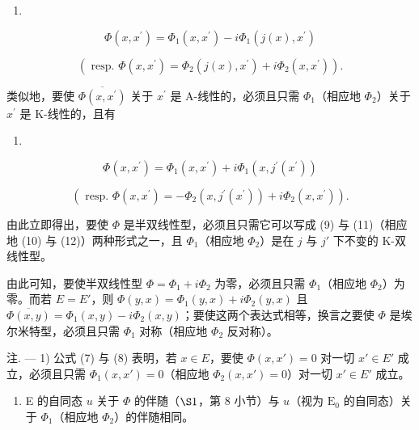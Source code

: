 \begin{enumerate}
\def\labelenumi{(\arabic{enumi})}
\setcounter{enumi}{8}
\tightlist
\item
\end{enumerate}

\[
\Phi (x, x ^ {\prime}) = \Phi_ {1} (x, x ^ {\prime}) - i \Phi_ {1} (j (x), x ^ {\prime})\tag{10}
\]

\[
(\text { resp. } \Phi (x, x ^ {\prime}) = \Phi_ {2} (j (x), x ^ {\prime}) + i \Phi_ {2} (x, x ^ {\prime})).
\]

类似地，要使 \(\overline{\Phi(x,x^{\prime})}\) 关于 \(x^{\prime}\) 是 A-线性的，必须且只需 \(\Phi_{1}\)（相应地 \(\Phi_{2}\)）关于 \(x^{\prime}\) 是 K-线性的，且有

\begin{enumerate}
\def\labelenumi{(\arabic{enumi})}
\setcounter{enumi}{10}
\tightlist
\item
\end{enumerate}

\[
\Phi (x, x ^ {\prime}) = \Phi_ {1} (x, x ^ {\prime}) + i \Phi_ {1} (x, j ^ {\prime} (x ^ {\prime}))\tag{12}
\]

\[
(\text { resp. } \Phi (x, x ^ {\prime}) = - \Phi_ {2} (x, j ^ {\prime} (x ^ {\prime})) + i \Phi_ {2} (x, x ^ {\prime})).
\]

由此立即得出，要使 \(\Phi\) 是半双线性型，必须且只需它可以写成 (9) 与 (11)（相应地 (10) 与 (12)）两种形式之一，且 \(\Phi_{1}\)（相应地 \(\Phi_{2}\)）是在 \(j\) 与 \(j'\) 下不变的 K-双线性型。

由此可知，要使半双线性型 \(\Phi = \Phi_{1} + i\Phi_{2}\) 为零，必须且只需 \(\Phi_{1}\)（相应地 \(\Phi_{2}\)）为零。而若 \(E = E'\)，则 \(\Phi(y, x) = \Phi_{1}(y, x) + i\Phi_{2}(y, x)\) 且 \(\overline{\Phi(x, y)} = \Phi_{1}(x, y) - i\Phi_{2}(x, y)\)；要使这两个表达式相等，换言之要使 \(\Phi\) 是埃尔米特型，必须且只需 \(\Phi_{1}\) 对称（相应地 \(\Phi_{2}\) 反对称）。

注. --- 1) 公式 (7) 与 (8) 表明，若 \(x \in E\)，要使 \(\Phi(x, x') = 0\) 对一切 \(x' \in E'\) 成立，必须且只需 \(\Phi_1(x, x') = 0\)（相应地 \(\Phi_2(x, x') = 0\)）对一切 \(x' \in E'\) 成立。

\begin{enumerate}
\def\labelenumi{\arabic{enumi})}
\setcounter{enumi}{1}
\tightlist
\item
  E 的自同态 \(u\) 关于 \(\Phi\) 的伴随（\(\S 1\)，第 8 小节）与 \(u\)（视为 \(\mathrm{E}_{0}\) 的自同态）关于 \(\Phi_{1}\)（相应地 \(\Phi_{2}\)）的伴随相同。
\end{enumerate}

